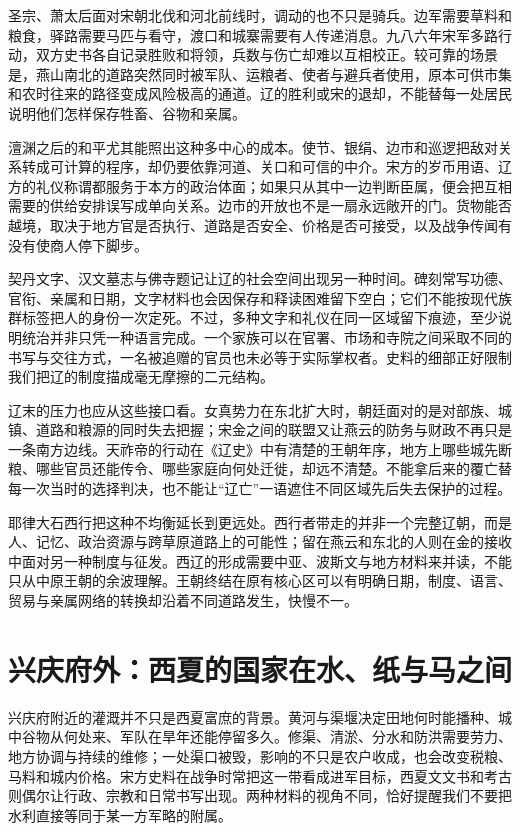 圣宗、萧太后面对宋朝北伐和河北前线时，调动的也不只是骑兵。边军需要草料和粮食，驿路需要马匹与看守，渡口和城寨需要有人传递消息。九八六年宋军多路行动，双方史书各自记录胜败和将领，兵数与伤亡却难以互相校正。较可靠的场景是，燕山南北的道路突然同时被军队、运粮者、使者与避兵者使用，原本可供市集和农时往来的路径变成风险极高的通道。辽的胜利或宋的退却，不能替每一处居民说明他们怎样保存牲畜、谷物和亲属。

澶渊之后的和平尤其能照出这种多中心的成本。使节、银绢、边市和巡逻把敌对关系转成可计算的程序，却仍要依靠河道、关口和可信的中介。宋方的岁币用语、辽方的礼仪称谓都服务于本方的政治体面；如果只从其中一边判断臣属，便会把互相需要的供给安排误写成单向关系。边市的开放也不是一扇永远敞开的门。货物能否越境，取决于地方官是否执行、道路是否安全、价格是否可接受，以及战争传闻有没有使商人停下脚步。

契丹文字、汉文墓志与佛寺题记让辽的社会空间出现另一种时间。碑刻常写功德、官衔、亲属和日期，文字材料也会因保存和释读困难留下空白；它们不能按现代族群标签把人的身份一次定死。不过，多种文字和礼仪在同一区域留下痕迹，至少说明统治并非只凭一种语言完成。一个家族可以在官署、市场和寺院之间采取不同的书写与交往方式，一名被追赠的官员也未必等于实际掌权者。史料的细部正好限制我们把辽的制度描成毫无摩擦的二元结构。

辽末的压力也应从这些接口看。女真势力在东北扩大时，朝廷面对的是对部族、城镇、道路和粮源的同时失去把握；宋金之间的联盟又让燕云的防务与财政不再只是一条南方边线。天祚帝的行动在《辽史》中有清楚的王朝年序，地方上哪些城先断粮、哪些官员还能传令、哪些家庭向何处迁徙，却远不清楚。不能拿后来的覆亡替每一次当时的选择判决，也不能让“辽亡”一语遮住不同区域先后失去保护的过程。

耶律大石西行把这种不均衡延长到更远处。西行者带走的并非一个完整辽朝，而是人、记忆、政治资源与跨草原道路上的可能性；留在燕云和东北的人则在金的接收中面对另一种制度与征发。西辽的形成需要中亚、波斯文与地方材料来并读，不能只从中原王朝的余波理解。王朝终结在原有核心区可以有明确日期，制度、语言、贸易与亲属网络的转换却沿着不同道路发生，快慢不一。

\section{兴庆府外：西夏的国家在水、纸与马之间}

兴庆府附近的灌溉并不只是西夏富庶的背景。黄河与渠堰决定田地何时能播种、城中谷物从何处来、军队在旱年还能停留多久。修渠、清淤、分水和防洪需要劳力、地方协调与持续的维修；一处渠口被毁，影响的不只是农户收成，也会改变税粮、马料和城内价格。宋方史料在战争时常把这一带看成进军目标，西夏文文书和考古则偶尔让行政、宗教和日常书写出现。两种材料的视角不同，恰好提醒我们不要把水利直接等同于某一方军略的附属。

